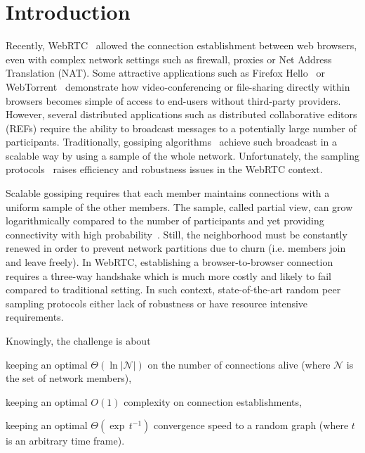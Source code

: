 
\section{Introduction}

Recently, WebRTC~\cite{webrtc} allowed the connection establishment between web
browsers, even with complex network settings such as firewall, proxies or Net
Address Translation (NAT).  Some attractive applications such as Firefox
Hello~\cite{firefoxhello} or WebTorrent~\cite{webtorrent} demonstrate how
video-conferencing or file-sharing directly within browsers becomes simple of
access to end-users without third-party providers. However, several distributed
applications such as distributed collaborative editors (REFs) require the
ability to broadcast messages to a potentially large number of
participants. Traditionally, gossiping algorithms~\cite{eugster2003lightweight,
  tolgyeski2009adaptive} achieve such broadcast in a scalable way by using a
sample of the whole network. Unfortunately, the sampling
protocols~\cite{eugster2003lightweight, tolgyeski2009adaptive, ganesh2003peer,
  jelasity2004peer, voulgaris2005cyclon} raises efficiency and robustness
issues in the WebRTC context.

Scalable gossiping requires that each member maintains connections with a
uniform sample of the other members. The sample, called partial view, can grow
logarithmically compared to the number of participants and yet providing
connectivity with high probability~\cite{erdos1959random}. Still, the
neighborhood must be constantly renewed in order to prevent network partitions
due to churn (i.e. members join and leave freely). In WebRTC, establishing a
browser-to-browser connection requires a three-way handshake which is much more
costly and likely to fail compared to traditional setting. In such context,
state-of-the-art random peer sampling protocols either lack of robustness or
have resource intensive requirements.

Knowingly, the challenge is about
\begin{inparaenum}[(i)]
\item keeping an optimal $\Theta(\ln |\mathcal{N}|)$ on the number of
  connections alive\cite{erdos1959random} (where $\mathcal{N}$ is the set of
  network members),
\item keeping an optimal $O(1)$ complexity on connection establishments,
\item keeping an optimal $\Theta(\exp \, t^{-1})$ convergence speed to a random
  graph (where $t$ is an arbitrary time frame).
\end{inparaenum}

